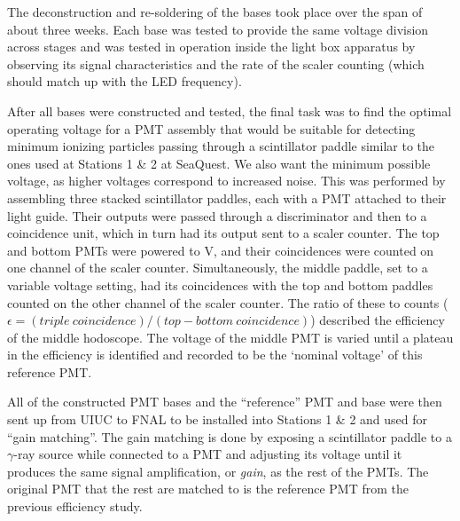 The deconstruction and re-soldering of the bases took place over the span of about three weeks. Each base was tested to provide the same voltage division across stages and was tested in operation inside the light box apparatus by observing its signal characteristics and the rate of the scaler counting (which should match up with the LED frequency).

After all bases were constructed and tested, the final task was to find the optimal operating voltage for a PMT assembly that would be suitable for detecting minimum ionizing particles passing through a scintillator paddle similar to the ones used at Stations 1 \& 2 at SeaQuest. We also want the minimum possible voltage, as higher voltages correspond to increased noise. This was performed by assembling three stacked scintillator paddles, each  with a PMT attached to their light guide. Their outputs were passed through a discriminator and then to a coincidence unit, which in turn had its output sent to a scaler counter. The top and bottom PMTs were powered to \unit[-1500]{V}, and their coincidences were counted on one channel of the scaler counter. Simultaneously, the middle paddle, set to a variable voltage setting, had its coincidences with the top and bottom paddles counted on the other channel of the scaler counter. The ratio of these to counts ($\epsilon = (triple\ coincidence) / (top-bottom\ coincidence)$) described the efficiency of the middle hodoscope. The voltage of the middle PMT is varied until a plateau in the efficiency is identified and recorded to be the `nominal voltage' of this reference PMT.

All of the constructed PMT bases and the ``reference'' PMT and base were then sent up from UIUC to FNAL to be installed into Stations 1 \& 2 and used for ``gain matching''. The gain matching is done by exposing a scintillator paddle to a $\gamma$-ray source while connected to a PMT and adjusting its voltage until it produces the same signal amplification, or \emph{gain}, as the rest of the PMTs. The original PMT that the rest are matched to is the reference PMT from the previous efficiency study.

